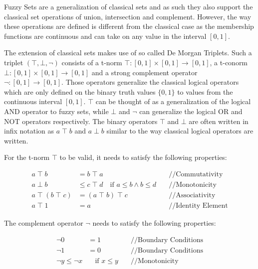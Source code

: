 Fuzzy Sets are a generalization of classical sets and as such they also support the classical set operations of union, intersection and complement. However, the way these operations are defined is different from the classical case as the membership functions are continuous and can take on any value in the interval $[0, 1]$.

The extension of classical sets makes use of so called De Morgan Triplets. Such a triplet $(\top, \bot, \neg)$ consists of a t-norm $\top : [0, 1] \times [0, 1] \rightarrow [0, 1]$, a t-conorm $\bot : [0, 1] \times [0, 1] \rightarrow [0, 1]$ and a strong complement operator $\neg : [0, 1] \rightarrow [0, 1]$. Those operators generalize the classical logical operators which are only defined on the binary truth values $\{0, 1\}$ to values from the continuous interval $[0, 1]$. $\top$ can be thought of as a generalization of the logical AND operator to fuzzy sets, while $\bot$  and $\neg$ can generalize the logical OR and NOT operators respectively. The binary operators $\top$ and $\bot$ are often written in infix notation as $a \; \top \; b$ and $a \; \bot \; b$ similar to the way classical logical operators are written.


For the t-norm $\top$ to be valid, it needs to satisfy the following properties:

\begin{align*}
      a \; \top \; b                & = b \; \top \; a                                              & \quad \text{//Commutativity}    \\
      a \; \bot \; b                & \leq c \; \top \; d  \quad \text{if }  a\leq b \land b \leq d & \quad \text{//Monotonicity}     \\
      a \; \top \; (b \; \top \; c) & = (a \; \top \; b) \; \top \; c                               & \quad \text{//Associativity}    \\
      a \; \top \; 1                & = a                                                           & \quad \text{//Identity Element}
\end{align*}

The complement operator $\neg$ needs to satisfy the following properties:

\begin{align*}
      \neg 0             & = 1                       & \quad \text{//Boundary Conditions} \\
      \neg 1             & = 0                       & \quad \text{//Boundary Conditions} \\
      \neg y \leq \neg x & \quad \text{if } x \leq y & \quad \text{//Monotonicity}
\end{align*}

